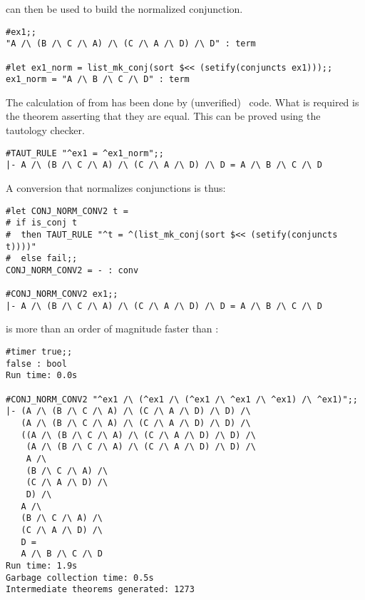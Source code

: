 \noindent can then be used to build the normalized conjunction.


\begin{session}\begin{verbatim}
#ex1;;
"A /\ (B /\ C /\ A) /\ (C /\ A /\ D) /\ D" : term

#let ex1_norm = list_mk_conj(sort $<< (setify(conjuncts ex1)));;
ex1_norm = "A /\ B /\ C /\ D" : term
\end{verbatim}\end{session}

\noindent The calculation of  from  has been
done by (unverified) \ML\ code. What is required is the theorem
asserting that they are equal. This can be proved using the tautology
checker.

\begin{session}\begin{verbatim}
#TAUT_RULE "^ex1 = ^ex1_norm";;
|- A /\ (B /\ C /\ A) /\ (C /\ A /\ D) /\ D = A /\ B /\ C /\ D
\end{verbatim}\end{session}

\noindent A conversion that normalizes conjunctions is thus:

\begin{session}\begin{verbatim}
#let CONJ_NORM_CONV2 t =
# if is_conj t
#  then TAUT_RULE "^t = ^(list_mk_conj(sort $<< (setify(conjuncts t))))"
#  else fail;;
CONJ_NORM_CONV2 = - : conv

#CONJ_NORM_CONV2 ex1;;
|- A /\ (B /\ C /\ A) /\ (C /\ A /\ D) /\ D = A /\ B /\ C /\ D
\end{verbatim}\end{session}

\noindent {} is more than an order of magnitude faster 
than :


\begin{session}\begin{verbatim}
#timer true;;
false : bool
Run time: 0.0s

#CONJ_NORM_CONV2 "^ex1 /\ (^ex1 /\ (^ex1 /\ ^ex1 /\ ^ex1) /\ ^ex1)";;
|- (A /\ (B /\ C /\ A) /\ (C /\ A /\ D) /\ D) /\
   (A /\ (B /\ C /\ A) /\ (C /\ A /\ D) /\ D) /\
   ((A /\ (B /\ C /\ A) /\ (C /\ A /\ D) /\ D) /\
    (A /\ (B /\ C /\ A) /\ (C /\ A /\ D) /\ D) /\
    A /\
    (B /\ C /\ A) /\
    (C /\ A /\ D) /\
    D) /\
   A /\
   (B /\ C /\ A) /\
   (C /\ A /\ D) /\
   D =
   A /\ B /\ C /\ D
Run time: 1.9s
Garbage collection time: 0.5s
Intermediate theorems generated: 1273
\end{verbatim}\end{session}

